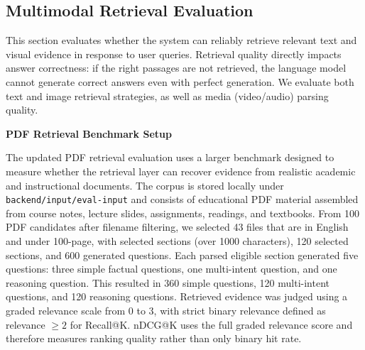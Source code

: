 \subsection{Multimodal Retrieval Evaluation}

This section evaluates whether the system can reliably retrieve relevant text and visual evidence in response to user queries. Retrieval quality directly impacts answer correctness: if the right passages are not retrieved, the language model cannot generate correct answers even with perfect generation. We evaluate both text and image retrieval strategies, as well as media (video/audio) parsing quality.

\textbf{PDF Retrieval Benchmark Setup}

The updated PDF retrieval evaluation uses a larger benchmark designed to measure whether the retrieval layer can recover evidence from realistic academic and instructional documents. The corpus is stored locally under \texttt{backend/input/eval-input} and consists of educational PDF material assembled from course notes, lecture slides, assignments, readings, and textbooks. From 100 PDF candidates after filename filtering, we selected 43 files that are in English and under 100-page, with selected sections (over 1000 characters), 120 selected sections, and 600 generated questions. Each parsed eligible section generated five questions: three simple factual questions, one multi-intent question, and one reasoning question. This resulted in 360 simple questions, 120 multi-intent questions, and 120 reasoning questions. Retrieved evidence was judged using a graded relevance scale from 0 to 3, with strict binary relevance defined as relevance $\geq 2$ for Recall@K. nDCG@K uses the full graded relevance score and therefore measures ranking quality rather than only binary hit rate.

\begin{table}[H]
    \centering
    \caption{PDF Retrieval Evaluation Dataset}
    \label{tab:pdf_retrieval_dataset}
\end{table}

